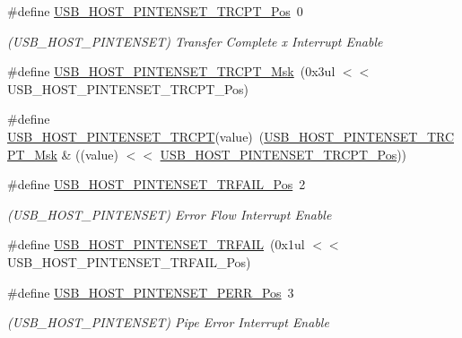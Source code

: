 \begin{DoxyCompactItemize}
\item 
\#define \mbox{\hyperlink{group___s_a_m_d21___u_s_b_gaa8d9cbab5a85407960e0d987baa97e88}{U\+S\+B\+\_\+\+H\+O\+S\+T\+\_\+\+P\+I\+N\+T\+E\+N\+S\+E\+T\+\_\+\+T\+R\+C\+P\+T\+\_\+\+Pos}}~0
\begin{DoxyCompactList}\small\item\em (U\+S\+B\+\_\+\+H\+O\+S\+T\+\_\+\+P\+I\+N\+T\+E\+N\+S\+ET) Transfer Complete x Interrupt Enable \end{DoxyCompactList}\item 
\#define \mbox{\hyperlink{group___s_a_m_d21___u_s_b_ga3f24e78627191f53e36e8784bd418f0b}{U\+S\+B\+\_\+\+H\+O\+S\+T\+\_\+\+P\+I\+N\+T\+E\+N\+S\+E\+T\+\_\+\+T\+R\+C\+P\+T\+\_\+\+Msk}}~(0x3ul $<$$<$ U\+S\+B\+\_\+\+H\+O\+S\+T\+\_\+\+P\+I\+N\+T\+E\+N\+S\+E\+T\+\_\+\+T\+R\+C\+P\+T\+\_\+\+Pos)
\item 
\#define \mbox{\hyperlink{group___s_a_m_d21___u_s_b_gaf76c5a96981b5f0062e41ec7667f31a6}{U\+S\+B\+\_\+\+H\+O\+S\+T\+\_\+\+P\+I\+N\+T\+E\+N\+S\+E\+T\+\_\+\+T\+R\+C\+PT}}(value)~(\mbox{\hyperlink{group___s_a_m_d21___u_s_b_ga3f24e78627191f53e36e8784bd418f0b}{U\+S\+B\+\_\+\+H\+O\+S\+T\+\_\+\+P\+I\+N\+T\+E\+N\+S\+E\+T\+\_\+\+T\+R\+C\+P\+T\+\_\+\+Msk}} \& ((value) $<$$<$ \mbox{\hyperlink{group___s_a_m_d21___u_s_b_gaa8d9cbab5a85407960e0d987baa97e88}{U\+S\+B\+\_\+\+H\+O\+S\+T\+\_\+\+P\+I\+N\+T\+E\+N\+S\+E\+T\+\_\+\+T\+R\+C\+P\+T\+\_\+\+Pos}}))
\item 
\#define \mbox{\hyperlink{group___s_a_m_d21___u_s_b_gafbb9bdaeb83cb5980a0e4dc15c45003c}{U\+S\+B\+\_\+\+H\+O\+S\+T\+\_\+\+P\+I\+N\+T\+E\+N\+S\+E\+T\+\_\+\+T\+R\+F\+A\+I\+L\+\_\+\+Pos}}~2
\begin{DoxyCompactList}\small\item\em (U\+S\+B\+\_\+\+H\+O\+S\+T\+\_\+\+P\+I\+N\+T\+E\+N\+S\+ET) Error Flow Interrupt Enable \end{DoxyCompactList}\item 
\#define \mbox{\hyperlink{group___s_a_m_d21___u_s_b_ga5a5c18c980841b6e7142313ac6990229}{U\+S\+B\+\_\+\+H\+O\+S\+T\+\_\+\+P\+I\+N\+T\+E\+N\+S\+E\+T\+\_\+\+T\+R\+F\+A\+IL}}~(0x1ul $<$$<$ U\+S\+B\+\_\+\+H\+O\+S\+T\+\_\+\+P\+I\+N\+T\+E\+N\+S\+E\+T\+\_\+\+T\+R\+F\+A\+I\+L\+\_\+\+Pos)
\item 
\#define \mbox{\hyperlink{group___s_a_m_d21___u_s_b_ga697d9ca2c5d3dca91806202f8c093c16}{U\+S\+B\+\_\+\+H\+O\+S\+T\+\_\+\+P\+I\+N\+T\+E\+N\+S\+E\+T\+\_\+\+P\+E\+R\+R\+\_\+\+Pos}}~3
\begin{DoxyCompactList}\small\item\em (U\+S\+B\+\_\+\+H\+O\+S\+T\+\_\+\+P\+I\+N\+T\+E\+N\+S\+ET) Pipe Error Interrupt Enable \end{DoxyCompactList}\item 
$$
\end{DoxyCompactItemize}

